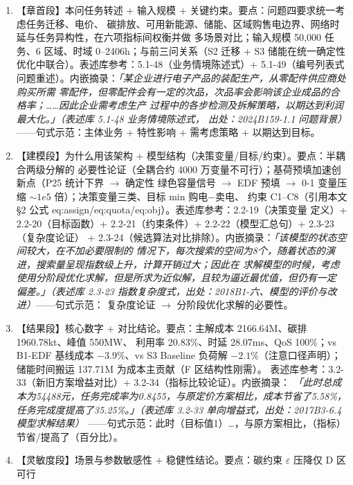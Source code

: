 \documentclass{internal-report}
\begin{document}
\begin{enumerate}
  \item 【章首段】本问任务转述 + 输入规模 + 关键约束。要点：问题四要求统一考虑任务迁移、电价、
        碳排放、可用新能源、储能、区域购售电边界、网络时延与任务异构性，在六项指标间权衡并做
        多场景对比；输入规模 50{,}000 任务、6 区域、时域 0--2406h；与前三问关系（S2 迁移 + S3
        储能在统一确定性优化中联合）。表述库参考：5.1-48（业务情境陈述式）+ 5.1-49（编号列表式
        问题重述）。内嵌摘录：\emph{「某企业进行电子产品的装配生产，从零配件供应商处购买所需
        零配件，但零配件会有一定的次品，次品率会影响该企业成品的合格率；……因此企业需考虑生产
        过程中的各步检测及拆解策略，以期达到利润最大化。」（表述库 5.1-48 业务情境陈述式，
        出处：2024B159-1.1 问题背景）}——句式示范：主体业务 + 特性影响 + 需考虑策略 + 以期达到目标。
  \item 【建模段】为什么用该架构 + 模型结构（决策变量/目标/约束）。要点：半耦合两级分解的
        必要性论证（全耦合约 4000 万变量不可行）；基荷预填加速创新点（P25 统计下界 $\to$ 确定性
        绿色容量信号 $\to$ EDF 预填 $\to$ 0-1 变量压缩 $\sim 1e5$ 倍）；决策变量三类、目标 min 购电$-$卖电、
        约束 C1--C8（引用本文 §2 公式 eq:assign/eq:quota/eq:obj）。表述库参考：2.2-19（决策变量
        定义）+ 2.2-20（目标函数）+ 2.2-21（约束条件）+ 2.2-22（模型汇总句）+ 2.3-23（复杂度论证）
        + 2.3-24（候选算法对比排除）。内嵌摘录：\emph{「该模型的状态空间较大，在不加必要限制的
        情况下，每次搜索的空间为8个，随着状态的演进，搜索量呈现指数级上升，计算开销过大；因此在
        求解模型的时候，考虑使用分阶段优化求解，但是所求为近似解，且较为逼近最优值，但仍有一定
        偏差。」（表述库 2.3-23 指数复杂度式，出处：2018B1-六、模型的评价与改进）}——句式示范：
        复杂度论证 $\to$ 分阶段优化求解的必要性。
  \item 【结果段】核心数字 + 对比结论。要点：主解成本 2166.64M、碳排 1960.78kt、峰值 550MW、
        利用率 20.83\%、时延 28.07ms、QoS 100\%；vs B1-EDF 基线成本 $-3.9\%$、vs S3 Baseline
        负荷解 $-2.1\%$（注意口径声明）；储能时间搬运 137.71M 为成本主贡献（F 区结构性刚需）。
        表述库参考：3.2-33（新旧方案增益对比）+ 3.2-34（指标比较论证）。内嵌摘录：
        \emph{「此时总成本为54488元，任务完成率为0.8455，与原定价方案相比，成本节省了5.58\%，
        任务完成度提高了35.25\%。」（表述库 3.2-33 单向增益式，出处：2017B3-6.4 模型求解结果）}
        ——句式示范：此时（目标值1）…，与原方案相比，（指标）节省/提高了（百分比）。
  \item 【灵敏度段】场景与参数敏感性 + 稳健性结论。要点：碳约束 $\varepsilon$ 压降仅 D 区可行

\end{enumerate}
\end{document}
